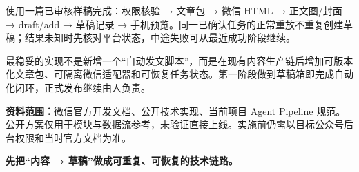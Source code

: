 \documentclass[UTF8,10pt,a4paper,fontset=none]{ctexart}
\begin{document}
\begin{keybox}[最小闭环验收]
使用一篇已审核样稿完成：权限核验 → 文章包 → 微信 HTML → 正文图/封面 → draft/add → 草稿记录 → 手机预览。同一已确认任务的正常重放不重复创建草稿；结果未知时先核对平台状态，中途失败可从最近成功阶段继续。
\end{keybox}

\begin{greenbox}[技术结论]
最稳妥的实现不是新增一个“自动发文脚本”，而是在现有内容生产链后增加可版本化文章包、可隔离微信适配器和可恢复任务状态。第一阶段做到草稿箱即完成自动化闭环，正式发布继续由人负责。
\end{greenbox}

\begin{plainbox}
{\small\color{Muted}\textbf{资料范围：}微信官方开发文档、公开技术实现、当前项目 Agent Pipeline 规范。公开方案仅用于模块与数据流参考，未验证直接上线。实施前仍需以目标公众号后台权限和当时官方文档为准。}
\end{plainbox}

\vfill
\begin{center}
{\sffamily\bfseries\Large\color{Navy}先把“内容 → 草稿”做成可重复、可恢复的技术链路。}
\end{center}
\end{document}

